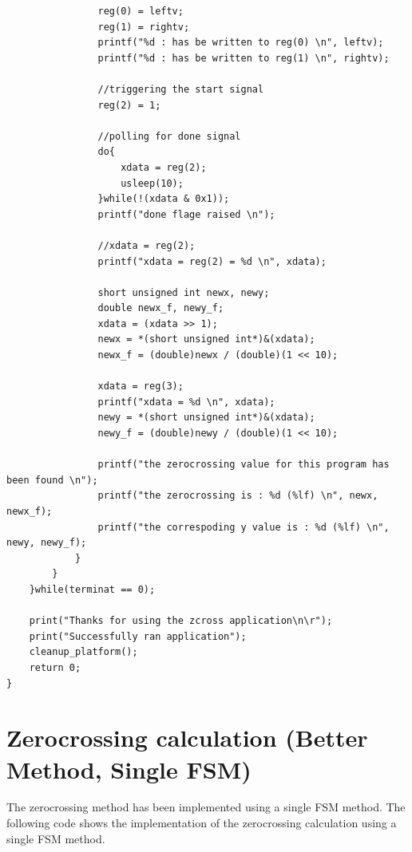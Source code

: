 \documentclass[11pt, a4paper]{report}
\begin{document}
\begin{verbatim}
    			reg(0) = leftv;
    			reg(1) = rightv;
    			printf("%d : has be written to reg(0) \n", leftv);
    			printf("%d : has be written to reg(1) \n", rightv);

    			//triggering the start signal
    			reg(2) = 1;

    			//polling for done signal
    			do{
    				xdata = reg(2);
    				usleep(10);
    			}while(!(xdata & 0x1));
    			printf("done flage raised \n");

    			//xdata = reg(2);
    			printf("xdata = reg(2) = %d \n", xdata);

    			short unsigned int newx, newy;
    			double newx_f, newy_f;
    			xdata = (xdata >> 1);
    			newx = *(short unsigned int*)&(xdata);
    			newx_f = (double)newx / (double)(1 << 10);

    			xdata = reg(3);
    			printf("xdata = %d \n", xdata);
    			newy = *(short unsigned int*)&(xdata);
    			newy_f = (double)newy / (double)(1 << 10);

    			printf("the zerocrossing value for this program has been found \n");
    			printf("the zerocrossing is : %d (%lf) \n", newx, newx_f);
    			printf("the correspoding y value is : %d (%lf) \n", newy, newy_f);
    		}
    	}
    }while(terminat == 0);

    print("Thanks for using the zcross application\n\r");
    print("Successfully ran application");
    cleanup_platform();
    return 0;
}
\end{verbatim}

\newpage
\section{Zerocrossing calculation (Better Method, Single FSM)}
The zerocrossing method has been implemented using a single FSM method. The following code shows the implementation of the zerocrossing calculation using a single FSM method.
\end{document}
